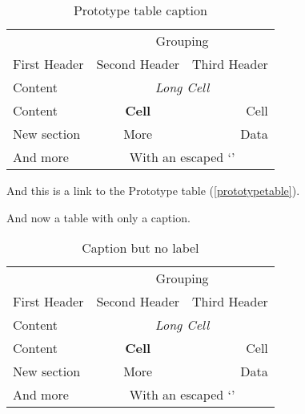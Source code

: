 
\def\mytitle{MultiMarkdown Table Test  }
\def\latexmode{memoir}

\begin{table}[htbp]
\begin{minipage}{\linewidth}
\setlength{\tymax}{0.5\linewidth}
\centering
\small
\caption{Prototype table caption}
\label{prototypetable}
\begin{tabular}{@{}lcr@{}} \toprule
&\multicolumn{2}{c}{Grouping}\\
First Header&Second Header&Third Header\\
\midrule
Content&\multicolumn{2}{c}{{\itshape Long Cell}}\\
Content&\textbf{Cell}&Cell\\

\midrule
New section&More&Data\\
And more&\multicolumn{2}{c}{With an escaped `\textbar{}'}\\

\bottomrule

\end{tabular}
\end{minipage}
\end{table}


And this is a link to the Prototype table (\autoref{prototypetable}).

And now a table with only a caption.

\begin{table}[htbp]
\begin{minipage}{\linewidth}
\setlength{\tymax}{0.5\linewidth}
\centering
\small
\caption{Caption but no label}
\label{captionbutnolabel}
\begin{tabular}{@{}lcr@{}} \toprule
&\multicolumn{2}{c}{Grouping}\\
First Header&Second Header&Third Header\\
\midrule
Content&\multicolumn{2}{c}{{\itshape Long Cell}}\\
Content&\textbf{Cell}&Cell\\

\midrule
New section&More&Data\\
And more&\multicolumn{2}{c}{With an escaped `\textbar{}'}\\

\bottomrule

\end{tabular}
\end{minipage}
\end{table}



